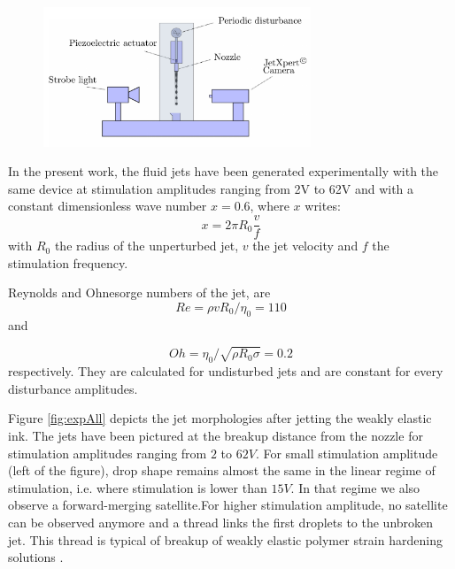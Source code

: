 \documentclass[twocolumn,10pt]{asme2ej}
\begin{document}
\begin{figure}[h]
    \centering
    \includegraphics[width=8cm]{device.png}
    \caption{}
    \label{device}
\end{figure}

In the present work, the fluid jets have been generated experimentally with the same device at stimulation amplitudes ranging from 2V to 62V and with a constant dimensionless wave number $x = 0.6$, where $x$ writes:
\begin{equation}\label{eq:waveNbr}
    x=2 \pi R_0 \frac{v}{f}
\end{equation}
with $R_0$ the radius of the unperturbed jet, $v$ the jet velocity and $f$ the stimulation frequency. 

Reynolds and Ohnesorge numbers of the jet, are
\begin{equation}
    Re= \rho v R_0 / \eta_0 = 110
\end{equation} and 
   
\begin{equation}
    Oh=\eta_0/\sqrt{\rho R_0 \sigma} = 0.2
\end{equation}
respectively. They are calculated for undisturbed jets and are constant for every disturbance amplitudes.


Figure \ref{fig:expAll} depicts the jet morphologies after jetting the weakly elastic ink. The jets have been pictured at the breakup distance from the nozzle for stimulation amplitudes ranging from $2$ to $62V$. 
For small stimulation amplitude (left of the figure), drop shape remains almost the same in the linear regime of stimulation, i.e. where stimulation is lower than $15V$. In that regime we also observe a forward-merging satellite.For higher stimulation amplitude, no satellite can be observed anymore and a thread links the first droplets to the unbroken jet. This thread is typical of breakup of weakly elastic polymer strain hardening solutions \cite{christanti2002effect}.
\end{document}
